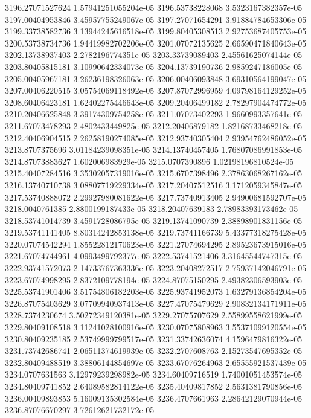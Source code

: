 {3196.27071527624 1.57941251055204e-05
3196.53738228068 3.5323167382357e-05
3197.00404953846 3.45957755249067e-05
3197.27071654291 3.91884784653306e-05
3199.33738582736 3.13944245616518e-05
3199.80405308513 2.92753687405753e-05
3200.53738734736 1.94419982702206e-05
3201.07072135625 2.66590471840643e-05
3202.13738937403 2.2782196774351e-05
3203.33739089403 2.45561625074144e-05
3203.80405815181 3.10990642334073e-05
3204.13739190736 2.9859247186005e-05
3205.00405967181 3.26236198326063e-05
3206.00406093848 3.69310564199047e-05
3207.00406220515 3.05754069118492e-05
3207.87072996959 4.09798164129252e-05
3208.60406423181 1.62402275446643e-05
3209.20406499182 2.78297904474772e-05
3210.20406625848 3.39174309754258e-05
3211.07073402293 1.9660993357641e-05
3211.67073478293 2.4802433449825e-05
3212.20406879182 1.82168733468218e-05
3212.40406904515 2.26258190274085e-05
3212.93740305404 2.93954762486052e-05
3213.8707375696 3.01184239098351e-05
3214.13740457405 1.76807086991853e-05
3214.87073883627 1.602006983929e-05
3215.0707390896 1.02198196810524e-05
3215.40407284516 3.35302057319016e-05
3215.6707398496 2.37863068267162e-05
3216.13740710738 3.08807719229334e-05
3217.20407512516 3.1712059345847e-05
3217.53740888072 2.29927980081622e-05
3217.73740913405 2.94900681592707e-05
3218.0040761385 2.8800199187433e-05
3218.20407639183 2.78983393173462e-05
3218.53741014739 3.4591728086795e-05
3219.13741090739 2.38898901831156e-05
3219.53741141405 8.80314242853138e-05
3219.73741166739 5.43377318275428e-05
3220.07074542294 1.85522812170623e-05
3221.27074694295 2.89523673915016e-05
3221.67074744961 4.0993499792377e-05
3222.53741521406 3.31645544747315e-05
3222.93741572073 2.14733767363336e-05
3223.20408272517 2.75937142046791e-05
3223.67074998295 2.8372109778194e-05
3224.87075150295 2.49382306593903e-05
3225.53741901406 3.51754806182203e-05
3225.93741952073 1.63279136854204e-05
3226.87075403629 3.07709940937413e-05
3227.47075479629 2.90832134171911e-05
3228.7374230674 3.50272349120381e-05
3229.27075707629 2.55899558621999e-05
3229.80409108518 3.11241028100916e-05
3230.07075808963 3.55371099120554e-05
3230.80409235185 2.53749999799517e-05
3231.33742636074 4.1596479816322e-05
3231.73742686741 2.06511374619939e-05
3232.2707608763 2.15273547695352e-05
3232.80409488519 3.38806144854697e-05
3233.67076264963 2.65555921537439e-05
3234.0707631563 3.12979239298982e-05
3234.60409716519 1.74001051453574e-05
3234.80409741852 2.64089582814122e-05
3235.40409817852 2.5631381790856e-05
3236.00409893853 5.16009135302584e-05
3236.4707661963 2.28642129070944e-05
3236.87076670297 3.72612621732172e-05
}
